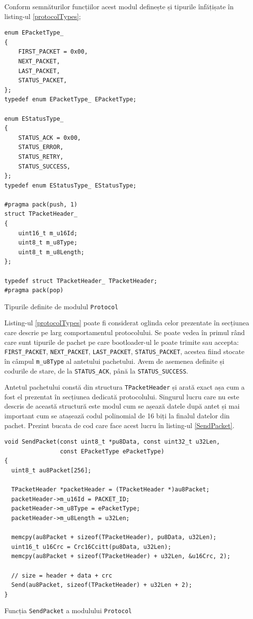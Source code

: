 \documentclass[12pt,a4paper,titlepage]{report}
\begin{document}
Conform semnăturilor funcțiilor acest modul definește și tipurile înfățișate în listing-ul \ref{protocolTypes};
\begin{listing}[h]
\begin{verbatim}
enum EPacketType_
{
    FIRST_PACKET = 0x00,
    NEXT_PACKET,
    LAST_PACKET,
    STATUS_PACKET,
};
typedef enum EPacketType_ EPacketType;

enum EStatusType_
{
    STATUS_ACK = 0x00,
    STATUS_ERROR,
    STATUS_RETRY,
    STATUS_SUCCESS,
};
typedef enum EStatusType_ EStatusType;

#pragma pack(push, 1)
struct TPacketHeader_
{
    uint16_t m_u16Id;
    uint8_t m_u8Type;
    uint8_t m_u8Length;
};

typedef struct TPacketHeader_ TPacketHeader;
#pragma pack(pop)
\end{verbatim}

\caption{Tipurile definite de modulul \texttt{Protocol}}
\label{protocolTypes}
\end{listing}

Listing-ul \ref{protocolTypes} poate fi considerat oglinda celor prezentate în secțiunea care descrie pe larg comportamentul protocolului. Se poate vedea în primul rând care sunt tipurile de pachet pe care bootloader-ul le poate trimite sau accepta: \texttt{FIRST\_PACKET}, \texttt{NEXT\_PACKET}, \texttt{LAST\_PACKET}, \texttt{STATUS\_PACKET}, acestea fiind stocate în câmpul \texttt{m\_u8Type} al antetului pachetului.
Avem de asemenea definite și codurile de stare, de la \texttt{STATUS\_ACK}, până la \texttt{STATUS\_SUCCESS}.

Antetul pachetului constă din structura \texttt{TPacketHeader} și arată exact așa cum a fost el prezentat în secțiunea dedicată protocolului. Singurul lucru care nu este descris de această structură este modul cum se așează datele după antet și mai important cum se atașează codul polinomial de 16 biți la finalul datelor din pachet. Prezint bucata de cod care face acest lucru în listing-ul \ref{SendPacket}.

\begin{listing}[h]
\begin{verbatim}
void SendPacket(const uint8_t *pu8Data, const uint32_t u32Len,
                const EPacketType ePacketType)
{
  uint8_t au8Packet[256];

  TPacketHeader *packetHeader = (TPacketHeader *)au8Packet;
  packetHeader->m_u16Id = PACKET_ID;
  packetHeader->m_u8Type = ePacketType;
  packetHeader->m_u8Length = u32Len;

  memcpy(au8Packet + sizeof(TPacketHeader), pu8Data, u32Len);
  uint16_t u16Crc = Crc16Ccitt(pu8Data, u32Len);
  memcpy(au8Packet + sizeof(TPacketHeader) + u32Len, &u16Crc, 2);

  // size = header + data + crc
  Send(au8Packet, sizeof(TPacketHeader) + u32Len + 2);
}
\end{verbatim}

\caption{Funcția \texttt{SendPacket} a modulului \texttt{Protocol}}
\label{SendPacket}
\end{listing}
\end{document}
